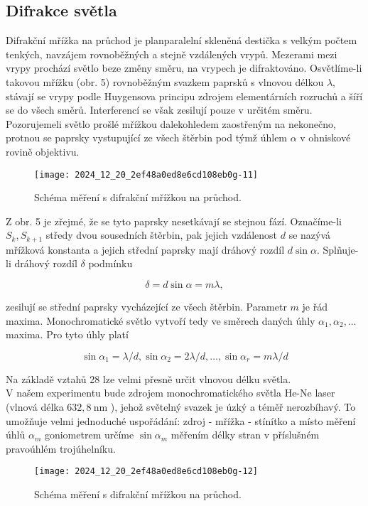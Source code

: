 \documentclass[czech,11pt,a4paper]{article}
\begin{document}
\begin{multicols}{2}
	\section*{Difrakce světla}
	Difrakční mřížka na průchod je planparalelní skleněná destička s velkým počtem tenkých, navzájem rovnoběžných a stejně vzdálených vrypů. Mezerami mezi vrypy prochází světlo beze změny směru, na vrypech je difraktováno. Osvětlíme-li takovou mřížku (obr. 5) rovnoběžným svazkem paprsků s vlnovou délkou $\lambda$, stávají se vrypy podle Huygensova principu zdrojem elementárních rozruchů a šíří se do všech směrů. Interferencí se však zesilují pouze v určitém směru. Pozorujemeli světlo prošlé mřížkou dalekohledem zaostřeným na nekonečno, protnou se paprsky vystupující ze všech štěrbin pod týmž úhlem $\alpha$ v ohniskové rovině objektivu.\\
	\begin{figure}[H]
		\texttt{[image: 2024\_12\_20\_2ef48a0ed8e6cd108eb0g-11]}
		\caption{Schéma měření s difrakční mřížkou na průchod.}
	\end{figure}
	
	
	
	Z obr. 5 je zřejmé, že se tyto paprsky nesetkávají se stejnou fází. Označíme-li $S_{k}, S_{k+1}$ středy dvou sousedních štěrbin, pak jejich vzdálenost $d$ se nazývá mřížková konstanta a jejich střední paprsky mají dráhový rozdíl $d \sin \alpha$. Splñuje-li dráhový rozdíl $\delta$ podmínku
	
	
	\begin{equation}
		\delta=d \sin \alpha=m \lambda,
	\end{equation}
	
	
	zesilují se střední paprsky vycházející ze všech štěrbin. Parametr $m$ je řád maxima. Monochromatické světlo vytvoří tedy ve směrech daných úhly $\alpha_{1}, \alpha_{2}, \ldots$ maxima. Pro tyto úhly platí
	
	
	\begin{equation}
		\sin \alpha_{1}=\lambda / d, \sin \alpha_{2}=2 \lambda / d, \ldots, \sin \alpha_{r}=m \lambda / d
	\end{equation}
	
	
	Na základě vztahů 28 lze velmi přesně určit vlnovou délku světla.\\
	V našem experimentu bude zdrojem monochromatického světla He-Ne laser (vlnová délka $632,8 \mathrm{~nm}$ ), jehož světelný svazek je úzký a téměř nerozbíhavý. To umožňuje velmi jednoduché uspořádání: zdroj - mřížka - stínítko a místo měření úhlů $\alpha_{m}$ goniometrem určíme $\sin \alpha_{m}$ měřením délky stran v příslušném pravoúhlém trojúhelníku.\\
	\begin{figure}[H]
		\texttt{[image: 2024\_12\_20\_2ef48a0ed8e6cd108eb0g-12]}
		\caption{Schéma měření s difrakční mřížkou na průchod.}
	\end{figure}
	

\end{multicols}
\end{document}
